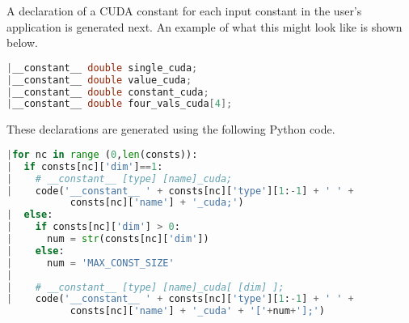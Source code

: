 A declaration of a CUDA constant for each input constant in the user's application is generated next. An example of what this might look like is shown below.
\begin{lstlisting}[backgroundcolor=\color{red!20}, language=C]
|__constant__ double single_cuda;
|__constant__ double value_cuda;
|__constant__ double constant_cuda;
|__constant__ double four_vals_cuda[4];
\end{lstlisting}

\noindent These declarations are generated using the following Python code.
\begin{lstlisting}[backgroundcolor = \color{lightgray!20}, language=Python]
|for nc in range (0,len(consts)):
|  if consts[nc]['dim']==1:
|    # __constant__ [type] [name]_cuda;
|    code('__constant__ ' + consts[nc]['type'][1:-1] + ' ' +
           consts[nc]['name'] + '_cuda;')
|  else:
|    if consts[nc]['dim'] > 0:
|      num = str(consts[nc]['dim'])
|    else:
|      num = 'MAX_CONST_SIZE'
|
|    # __constant__ [type] [name]_cuda[ [dim] ];
|    code('__constant__ ' + consts[nc]['type'][1:-1] + ' ' +
           consts[nc]['name'] + '_cuda' + '['+num+'];')
\end{lstlisting}

